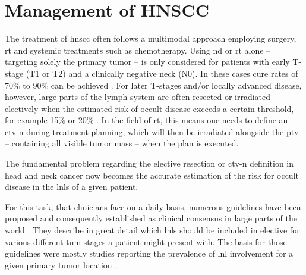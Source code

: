 \documentclass[\relativeRoot/main.tex]{subfiles}
\begin{document}
\section{Management of HNSCC}
\label{sec:intro:management}

The treatment of \gls{hnscc} often follows a multimodal approach employing surgery, \gls{rt} and systemic treatments such as chemotherapy. Using \gls{nd} or \gls{rt} alone -- targeting solely the primary tumor -- is only considered for patients with early T-stage (T1 or T2) and a clinically negative neck (N0). In these cases cure rates of 70\% to 90\% can be achieved \cite{pfister_head_2014}. For later T-stages and/or locally advanced disease, however, large parts of the lymph system are often resected or irradiated electively when the estimated risk of occult disease exceeds a certain threshold, for example 15\% or 20\% \cite{weiss_use_1997,pitman_rationale_2000,pillsbury_iii_rationale_1997}. In the field of \acrlong{rt}, this means one needs to define an \gls{ctv-n} during treatment planning, which will then be irradiated alongside the \gls{ptv} -- containing all visible tumor mass -- when the plan is executed.

The fundamental problem regarding the elective resection or \gls{ctv-n} definition in head and neck cancer now becomes the accurate estimation of the risk for occult disease in the \glspl{lnl} of a given patient.

For this task, that clinicians face on a daily basis, numerous guidelines have been proposed and consequently established as clinical consensus in large parts of the world \cite{gregoire_ct-based_2003,gregoire_delineation_2014,gregoire_delineation_2018,gregoire_proposal_2006,gregoire_selection_2000,biau_selection_2019,eisbruch_intensity-modulated_2002,ferlito_elective_2009,vorwerk_guidelines_2011,chao_determination_2002}. They describe in great detail which \glspl{lnl} should be included in elective  for various different \gls{tnm} stages a patient might present with. The basis for those guidelines were mostly studies reporting the prevalence of \gls{lnl} involvement for a given primary tumor location \cite{candela_patterns_1990,shah_patterns_1990,woolgar_histological_1999,woolgar_topography_2007,chao_determination_2002,vauterin_patterns_2006,razfar_incidence_2009,ho_patterns_2012}.
\end{document}
